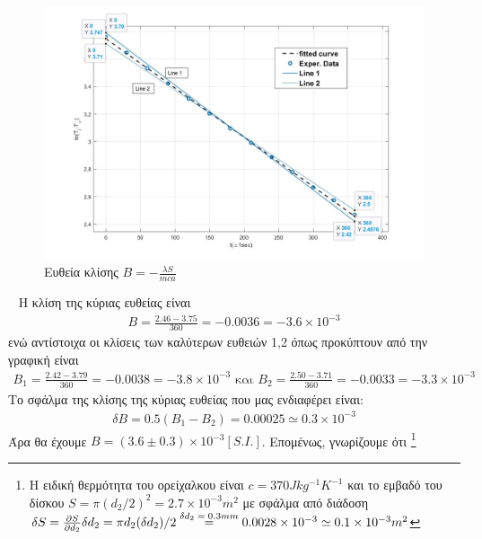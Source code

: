 \documentclass[a4paper]{article}
\begin{document}
\begin{figure}[h!]
\centering 
\caption{ Ευθεία κλίσης $B=-\frac{\lambda S}{mca}$}
\includegraphics[scale=0.4]{insulator_1_cross.jpg}
\end{figure}
\textcolor{white}{g}  \newline\newline
Η κλίση της κύριας ευθείας είναι 
\begin{align*}
B = \frac{2.46-3.75}{360} = -0.0036 = -3.6\times10^{-3}
\end{align*}
ενώ αντίστοιχα οι κλίσεις των καλύτερων ευθειών 1,2 όπως προκύπτουν από την γραφική είναι
\begin{align*}
B_1= \frac{2.42-3.79}{360}=-0.0038=-3.8\times10^{-3}    \text{ και  } B_2 = \frac{2.50-3.71}{360}=-0.0033 = -3.3\times10^{-3}
\end{align*}
Το σφάλμα της κλίσης της κύριας ευθείας που μας ενδιαφέρει είναι: 
\begin{align*}
\delta B = 0.5(B_1-B_2)  = 0.00025 \simeq 0.3\times10^{-3}
\end{align*}
 Άρα θα έχουμε $B=(3.6\pm0.3)\times10^{-3} [S.I.]$. Επομένως, γνωρίζουμε ότι
 \footnote{Η ειδική θερμότητα του ορείχαλκου είναι $c=370Jkg^{-1}K^{-1}$ και το εμβαδό του δίσκου $S=\pi(d_2/2)^2 = 2.7\times10^{-3}m^2$ με σφάλμα από διάδοση $\delta S = \pdv{S}{d_2}\delta d_2 = \pi d_2(\delta d_2)/2  \stackrel{\text{$\delta d_2 =0.3mm$}}{=} 0.0028\times10^{-3}\simeq 0.1\times10^{-3}  m^2$}
 
\end{document}
